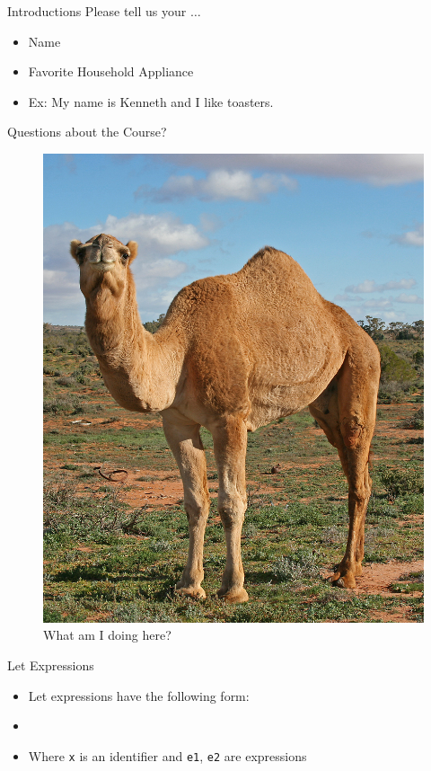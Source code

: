 \documentclass{beamer}
\begin{document}
    \begin{frame}{Introductions}
        Please tell us your $\ldots$
        \begin{itemize}
            \item Name
            \item Favorite Household Appliance
            \item Ex: My name is Kenneth and I like toasters.
        \end{itemize}
    \end{frame}
    
    \begin{frame}{Questions about the Course?}
        \begin{figure}
            \centering
            \includegraphics[scale = 0.1]{camel.jpg}
            \caption{What am I doing here?}
        \end{figure}
    \end{frame}
    
    \begin{frame}{Let Expressions}
        \begin{itemize}
            \item Let expressions have the following form:
            \item {}
            \item Where \texttt{x} is an identifier and \texttt{e1}, \texttt{e2} are expressions
        \end{itemize}
    \end{frame}
    
\end{document}
